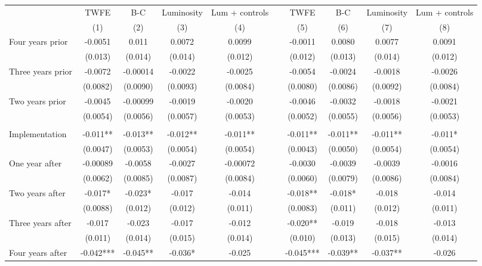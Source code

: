 \begin{tabular}{lccccccccc}
\toprule
      & TWFE  & B-C   & Luminosity & Lum + controls &       & TWFE  & B-C   & Luminosity & Lum + controls \\
\cmidrule{2-5}\cmidrule{7-10}      & (1)   & (2)   & (3)   & (4)   &       & (5)   & (6)   & (7)   & (8) \\
\midrule
\midrule
Four years prior & -0.0051 & 0.011 & 0.0072 & 0.0099 &       & -0.0011 & 0.0080 & 0.0077 & 0.0091 \\
      & (0.013) & (0.014) & (0.014) & (0.012) &       & (0.012) & (0.013) & (0.014) & (0.012) \\
Three years prior & -0.0072 & -0.00014 & -0.0022 & -0.0025 &       & -0.0054 & -0.0024 & -0.0018 & -0.0026 \\
      & (0.0082) & (0.0090) & (0.0093) & (0.0084) &       & (0.0080) & (0.0086) & (0.0092) & (0.0084) \\
Two years prior & -0.0045 & -0.00099 & -0.0019 & -0.0020 &       & -0.0046 & -0.0032 & -0.0018 & -0.0021 \\
      & (0.0054) & (0.0056) & (0.0057) & (0.0053) &       & (0.0052) & (0.0055) & (0.0056) & (0.0053) \\
      &       &       &       &       &       &       &       &       &  \\
Implementation & -0.011** & -0.013** & -0.012** & -0.011** &       & -0.011** & -0.011** & -0.011** & -0.011* \\
      & (0.0047) & (0.0053) & (0.0054) & (0.0054) &       & (0.0043) & (0.0050) & (0.0054) & (0.0054) \\
One year after & -0.00089 & -0.0058 & -0.0027 & -0.00072 &       & -0.0030 & -0.0039 & -0.0039 & -0.0016 \\
      & (0.0062) & (0.0085) & (0.0087) & (0.0084) &       & (0.0060) & (0.0079) & (0.0086) & (0.0084) \\
Two years after & -0.017* & -0.023* & -0.017 & -0.014 &       & -0.018** & -0.018* & -0.018 & -0.014 \\
      & (0.0088) & (0.012) & (0.012) & (0.011) &       & (0.0083) & (0.011) & (0.012) & (0.011) \\
Three years after & -0.017 & -0.023 & -0.017 & -0.012 &       & -0.020** & -0.019 & -0.018 & -0.013 \\
      & (0.011) & (0.014) & (0.015) & (0.014) &       & (0.010) & (0.013) & (0.015) & (0.014) \\
Four years after & -0.042*** & -0.045** & -0.036* & -0.025 &       & -0.045*** & -0.039** & -0.037** & -0.026 \\

\end{tabular}

